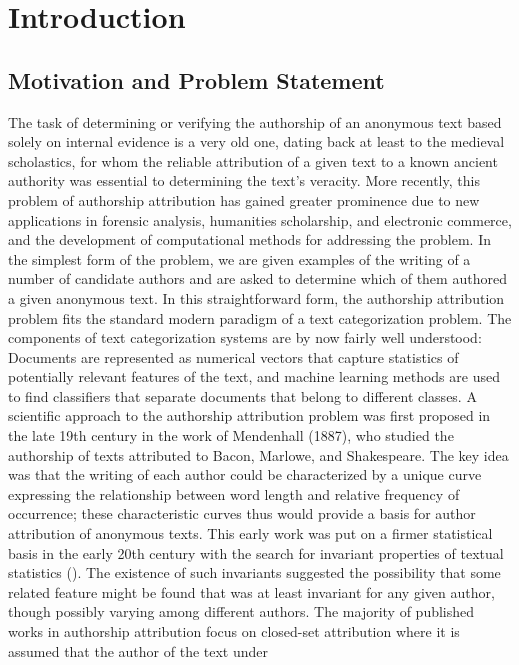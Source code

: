 \chapter{Introduction}
\section{Motivation and Problem Statement}
The task of determining or verifying the authorship of an anonymous text based solely on internal evidence is a very old one, dating back at least to the medieval scholastics, for whom the reliable attribution of a given text to a known ancient authority was essential to determining the text’s veracity. More recently, this problem of authorship attribution has gained greater prominence due to new applications in forensic analysis, humanities scholarship, and electronic commerce, and the development of computational methods for addressing the problem.
In the simplest form of the problem, we are given examples
of the writing of a number of candidate authors and are asked
to determine which of them authored a given anonymous
text. In this straightforward form, the authorship attribution
problem fits the standard modern paradigm of a text categorization problem. The components of text categorization systems are by
now fairly well understood: Documents are represented as
numerical vectors that capture statistics of potentially relevant features of the text, and machine learning methods are
used to find classifiers that separate documents that belong
to different classes.
A scientific approach to the authorship attribution problem was first proposed in the late 19th century in the work of Mendenhall (1887), who studied the authorship of texts attributed to Bacon, Marlowe, and Shakespeare.
The key idea was that
the writing of each author could be characterized by a unique
curve expressing the relationship between word length and
relative frequency of occurrence; these characteristic curves
thus would provide a basis for author attribution of anonymous texts. This early work was put on a firmer statistical
basis in the early 20th century with the search for invariant properties of textual statistics \citeauthor{zipf1932selected} (\citeyear{zipf1932selected}). The existence
of such invariants suggested the possibility that some related
feature might be found that was at least invariant for any given
author, though possibly varying among different authors.
The majority of published works in authorship
attribution focus on closed-set attribution where
it is assumed that the author of the text under
